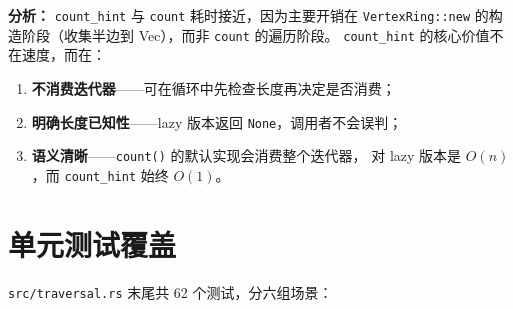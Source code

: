 \documentclass[11pt,a4paper]{article}
\begin{document}
\textbf{分析：} \texttt{count\_hint} 与 \texttt{count} 耗时接近，因为主要开销在
\texttt{VertexRing::new} 的构造阶段（收集半边到 Vec），而非 \texttt{count} 的遍历阶段。
\texttt{count\_hint} 的核心价值不在速度，而在：
\begin{enumerate}
  \item \textbf{不消费迭代器}——可在循环中先检查长度再决定是否消费；
  \item \textbf{明确长度已知性}——lazy 版本返回 \texttt{None}，调用者不会误判；
  \item \textbf{语义清晰}——\texttt{count()} 的默认实现会消费整个迭代器，
        对 lazy 版本是 $O(n)$，而 \texttt{count\_hint} 始终 $O(1)$。
\end{enumerate}

\section{单元测试覆盖}

\texttt{src/traversal.rs} 末尾共 62 个测试，分六组场景：
\end{document}
